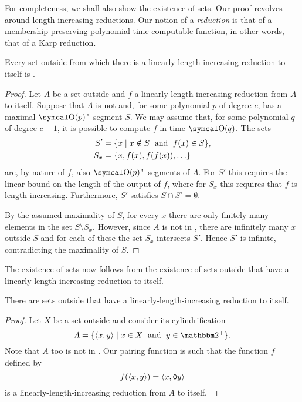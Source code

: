 For completeness, we shall also show the existence of  sets.
Our proof revolves around length-increasing reductions.
Our notion of a \emph{reduction} is that of a membership preserving polynomial-time computable function, in other words, that of a Karp reduction.
\begin{theorem}
  Every set outside  from which there is a linearly-length-increasing reduction to itself is .
\end{theorem}
\begin{proof}
  Let $A$ be a set outside  and $f$ a linearly-length-increasing reduction from $A$ to itself.
  Suppose that $A$ is not  and, for some polynomial $p$ of degree $c$, has a maximal $\bigO(p)$"~segment $S$.
  We may assume that, for some polynomial $q$ of degree $c - 1$, it is possible to compute $f$ in time $\bigO(q)$.
  The sets
  \begin{align*}
    S' &= \{x \;|\; x \notin S \;\text{ and }\; f(x) \in S\}, \\
    S_x &= \{x, f(x), f(f(x)), \ldots\}
  \end{align*}
  are, by nature of $f$, also $\bigO(p)$"~segments of $A$.
  For $S'$ this requires the linear bound on the length of the output of $f$, where for $S_x$ this requires that $f$ is length-increasing.
  Furthermore, $S'$ satisfies $S \cap S' = \emptyset$.

  By the assumed maximality of $S$, for every $x$ there are only finitely many elements in the set $S \setminus S_x$.
  However, since $A$ is not in , there are infinitely many $x$ outside $S$ and for each of these the set $S_x$ intersects $S'$.
  Hence $S'$ is infinite, contradicting the maximality of $S$.
\end{proof}

The existence of  sets now follows from the existence of sets outside  that have a linearly-length-increasing reduction to itself.
\begin{lemma}
  There are sets outside  that have a linearly-length-increasing reduction to itself.
\end{lemma}
\begin{proof}
  Let $X$ be a set outside  and consider its cylindrification \parencite{balcazar1990structural}
  \begin{equation*}
    A \deq \{\pair{x}{y} \st x \in X \reland y \in \binary^+\}.
  \end{equation*}
  Note that $A$ too is not in .
  Our pairing function is such that the function $f$ defined by
  \begin{equation*}
    f({\langle x, y\rangle}) = {\langle x, \textnormal{\texttt{0}}y\rangle}
  \end{equation*}
  is a linearly-length-increasing reduction from $A$ to itself.
\end{proof}

